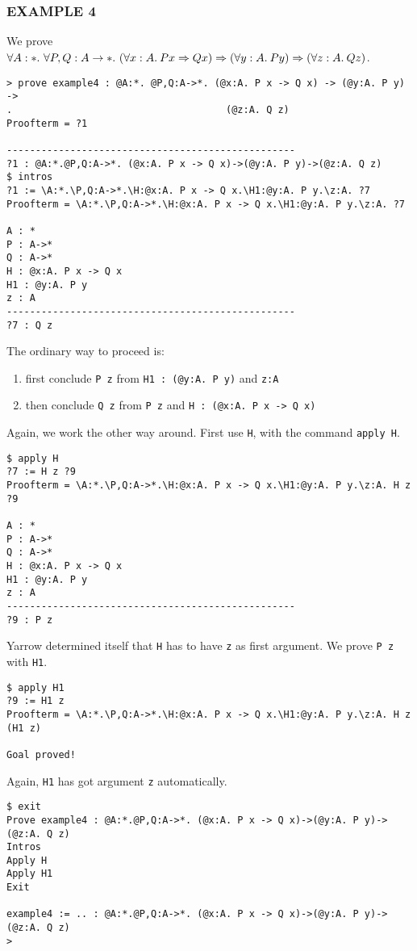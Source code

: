 \subsubsection*{EXAMPLE 4}
We prove
$\forall A:\st.\ 
  \forall P,Q:A\rightarrow\st.\ 
  (\forall x:A.\:P x\Rightarrow Q x) \Rightarrow (\forall y:A.\:P y) \Rightarrow (\forall z:A.\:Q z) 
$.
\begin{verbatim}
> prove example4 : @A:*. @P,Q:A->*. (@x:A. P x -> Q x) -> (@y:A. P y) -> 
.                                     (@z:A. Q z)
Proofterm = ?1

--------------------------------------------------
?1 : @A:*.@P,Q:A->*. (@x:A. P x -> Q x)->(@y:A. P y)->(@z:A. Q z)
$ intros
?1 := \A:*.\P,Q:A->*.\H:@x:A. P x -> Q x.\H1:@y:A. P y.\z:A. ?7
Proofterm = \A:*.\P,Q:A->*.\H:@x:A. P x -> Q x.\H1:@y:A. P y.\z:A. ?7

A : *
P : A->*
Q : A->*
H : @x:A. P x -> Q x
H1 : @y:A. P y
z : A
--------------------------------------------------
?7 : Q z
\end{verbatim}
The ordinary way to proceed is:
\begin{enumerate}
\item
first conclude
{\tt P z}
from
{\tt H1 : (@y:A. P y)}
and
{\tt z:A}
\item
then conclude
{\tt Q z} from {\tt P z} and {\tt H : (@x:A. P x -> Q x)}
\end{enumerate}
Again, we work the other way around.
First use {\tt H},
with the command {\tt apply H}.
\begin{verbatim}
$ apply H
?7 := H z ?9
Proofterm = \A:*.\P,Q:A->*.\H:@x:A. P x -> Q x.\H1:@y:A. P y.\z:A. H z ?9

A : *
P : A->*
Q : A->*
H : @x:A. P x -> Q x
H1 : @y:A. P y
z : A
--------------------------------------------------
?9 : P z
\end{verbatim}
Yarrow determined itself that {\tt H} has to have {\tt z} as first argument.
We prove {\tt P z} with {\tt H1}.
\begin{verbatim}
$ apply H1
?9 := H1 z
Proofterm = \A:*.\P,Q:A->*.\H:@x:A. P x -> Q x.\H1:@y:A. P y.\z:A. H z (H1 z)

Goal proved!
\end{verbatim}
Again, {\tt H1} has got argument {\tt z} automatically.
\begin{verbatim}
$ exit
Prove example4 : @A:*.@P,Q:A->*. (@x:A. P x -> Q x)->(@y:A. P y)->(@z:A. Q z)
Intros
Apply H
Apply H1
Exit

example4 := .. : @A:*.@P,Q:A->*. (@x:A. P x -> Q x)->(@y:A. P y)->(@z:A. Q z)
> 
\end{verbatim}



